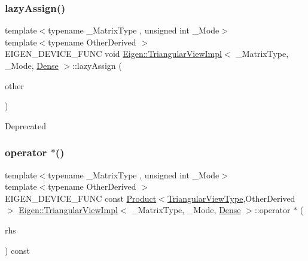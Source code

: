\subsubsection{\texorpdfstring{lazyAssign()}{lazyAssign()}\hspace{0.1cm}{\footnotesize\ttfamily [2/2]}}
{\footnotesize\ttfamily template$<$typename \+\_\+\+Matrix\+Type , unsigned int \+\_\+\+Mode$>$ \\
template$<$typename Other\+Derived $>$ \\
E\+I\+G\+E\+N\+\_\+\+D\+E\+V\+I\+C\+E\+\_\+\+F\+U\+NC void \mbox{\hyperlink{class_eigen_1_1_triangular_view_impl}{Eigen\+::\+Triangular\+View\+Impl}}$<$ \+\_\+\+Matrix\+Type, \+\_\+\+Mode, \mbox{\hyperlink{struct_eigen_1_1_dense}{Dense}} $>$\+::lazy\+Assign (\begin{DoxyParamCaption}\item[{const \mbox{\hyperlink{class_eigen_1_1_matrix_base}{Matrix\+Base}}$<$ Other\+Derived $>$ \&}]{other }\end{DoxyParamCaption})}

\begin{DoxyRefDesc}{Deprecated}
\item[\mbox{\hyperlink{deprecated__deprecated000010}{Deprecated}}]\end{DoxyRefDesc}
\mbox{\label{class_eigen_1_1_triangular_view_impl_3_01___matrix_type_00_01___mode_00_01_dense_01_4_a995853451299cd289510b1c3d0923155}} 
\subsubsection{\texorpdfstring{operator $\ast$()}{operator *()}}
{\footnotesize\ttfamily template$<$typename \+\_\+\+Matrix\+Type , unsigned int \+\_\+\+Mode$>$ \\
template$<$typename Other\+Derived $>$ \\
E\+I\+G\+E\+N\+\_\+\+D\+E\+V\+I\+C\+E\+\_\+\+F\+U\+NC const \mbox{\hyperlink{class_eigen_1_1_product}{Product}}$<$\mbox{\hyperlink{class_eigen_1_1_triangular_view}{Triangular\+View\+Type}},Other\+Derived$>$ \mbox{\hyperlink{class_eigen_1_1_triangular_view_impl}{Eigen\+::\+Triangular\+View\+Impl}}$<$ \+\_\+\+Matrix\+Type, \+\_\+\+Mode, \mbox{\hyperlink{struct_eigen_1_1_dense}{Dense}} $>$\+::operator $\ast$ (\begin{DoxyParamCaption}\item[{const \mbox{\hyperlink{class_eigen_1_1_matrix_base}{Matrix\+Base}}$<$ Other\+Derived $>$ \&}]{rhs }\end{DoxyParamCaption}) const\hspace{0.3cm}{\ttfamily [inline]}}

